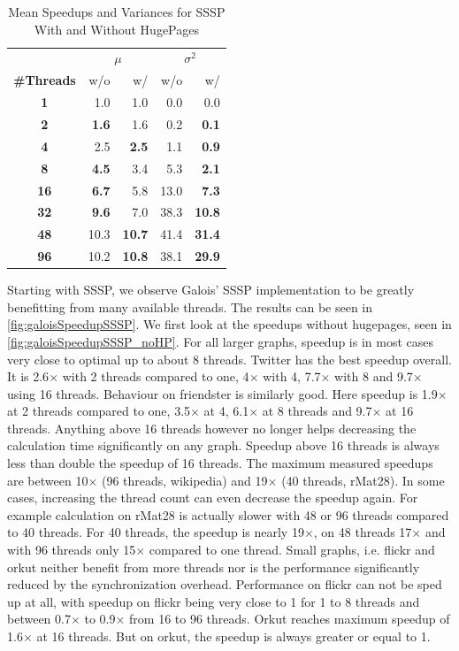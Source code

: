 \begin{table}
\renewcommand{\arraystretch}{1.3}
\centering
\caption{Mean Speedups and Variances for SSSP With and Without HugePages}
\label{tbl:ssspMeansVariances}
\begin{tabular}{c
r@{\tabskip 1 \tabcolsep}r
r@{\tabskip 1 \tabcolsep}r}
\toprule
&\multicolumn{2}{c}{\!\!\!$\mu$}&\multicolumn{2}{c}{\!\!$\sigma^2$}\\
\cmidrule(r){2-3}\cmidrule(r){4-5}
{\bf\#Threads}&w/o&w/&w/o&w/\\\midrule
\bf1 & 1.0 & 1.0 & 0.0 & 0.0 \\
\bf2 & \bf 1.6 & 1.6 & 0.2 & \bf 0.1 \\
\bf4 & 2.5 & \bf 2.5 & 1.1 & \bf 0.9 \\
\bf8 & \bf 4.5 & 3.4 & 5.3 & \bf 2.1 \\
\bf16 & \bf 6.7 & 5.8 & 13.0 & \bf 7.3 \\
\bf32 & \bf 9.6 & 7.0 & 38.3 & \bf 10.8 \\
\bf48 & 10.3 & \bf 10.7 & 41.4 & \bf 31.4 \\
\bf96 & 10.2 & \bf 10.8 & 38.1 & \bf 29.9 \\
\bottomrule
\end{tabular}
\end{table}

Starting with SSSP, we observe Galois' SSSP implementation to be greatly benefitting from many available threads. The results can be seen in \autoref{fig:galoisSpeedupSSSP}.
We first look at the speedups without hugepages, seen in \autoref{fig:galoisSpeedupSSSP_noHP}.
For all larger graphs, speedup is in most cases very close to optimal up to about 8 threads.
Twitter has the best speedup overall. It is 2.6$\times$ with 2 threads compared to one, 4$\times$ with 4, 7.7$\times$ with 8 and 9.7$\times$ using 16 threads.
Behaviour on friendster is similarly good. Here speedup is 1.9$\times$ at 2 threads compared to one, 3.5$\times$ at 4, 6.1$\times$ at 8 threads and 9.7$\times$ at 16 threads.
Anything above 16 threads however no longer helps decreasing the calculation time significantly on any graph. Speedup above 16 threads is always less than double the speedup of 16 threads. The maximum measured speedups are between 10$\times$ (96 threads, wikipedia) and 19$\times$ (40 threads, rMat28).
In some cases, increasing the thread count can even decrease the speedup again. For example calculation on rMat28 is actually slower with 48 or 96 threads compared to 40 threads. For 40 threads, the speedup is nearly 19$\times$, on 48 threads 17$\times$ and with 96 threads only 15$\times$ compared to one thread.
Small graphs, i.e. flickr and orkut neither benefit from more threads nor is the performance significantly reduced by the synchronization overhead.
Performance on flickr can not be sped up at all, with speedup on flickr being very close to 1 for 1 to 8 threads and between 0.7$\times$ to 0.9$\times$ from 16 to 96 threads.
Orkut reaches maximum speedup of 1.6$\times$ at 16 threads. But on orkut, the speedup is always greater or equal to 1.

